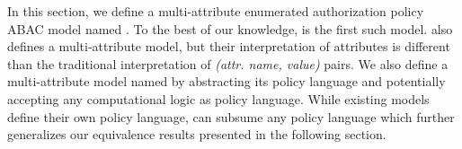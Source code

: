 
In this section, we define a multi-attribute enumerated authorization policy ABAC model named \EPMNModel{}. To the best of our knowledge, \EPMNModel{} is the first such model. \PM{}\cite{policy-machine} also defines a multi-attribute \EPModels{} model, but their interpretation of attributes is different than the traditional interpretation of \textit{(attr. name, value)} pairs. We also define a multi-attribute \LPModels{} model named \LPMN{}  by abstracting its policy language and potentially accepting any computational logic as policy language. While existing \LPModels{} models  define their own policy language, \LPMN{} can subsume any policy language which further generalizes our equivalence results presented in the following section.  



